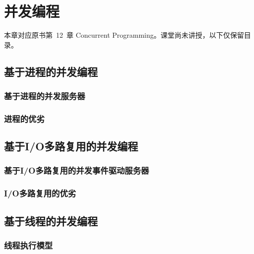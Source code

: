 \chapter{并发编程}

本章对应原书第~12~章 Concurrent Programming。课堂尚未讲授，以下仅保留目录。

\section{基于进程的并发编程}

\pending

\subsection{基于进程的并发服务器}

\pending

\subsection{进程的优劣}

\pending

\section{基于I/O多路复用的并发编程}

\pending

\subsection{基于I/O多路复用的并发事件驱动服务器}

\pending

\subsection{I/O多路复用的优劣}

\pending

\section{基于线程的并发编程}

\pending

\subsection{线程执行模型}

\pending

